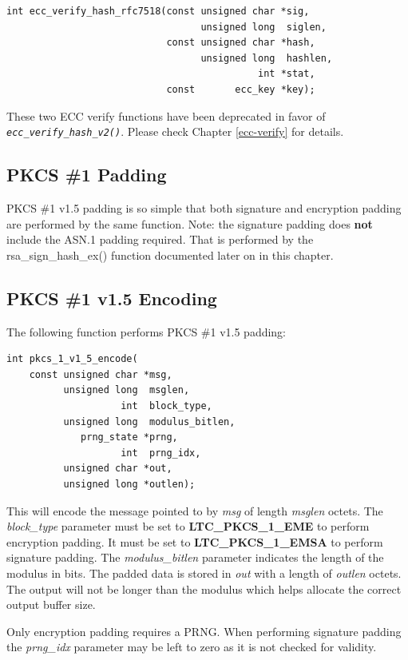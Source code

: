 \documentclass[synpaper]{book}
\newcommand{\code}[1]{\texttt{\textit{#1}}}
\begin{document}
\begin{verbatim}
int ecc_verify_hash_rfc7518(const unsigned char *sig,
                                  unsigned long  siglen,
                            const unsigned char *hash,
                                  unsigned long  hashlen,
                                            int *stat,
                            const       ecc_key *key);
\end{verbatim}

These two ECC verify functions have been deprecated in favor of \code{ecc\_verify\_hash\_v2()}.
Please check Chapter \ref{ecc-verify} for details.
\subsection{PKCS \#1 Padding}
PKCS \#1 v1.5 padding is so simple that both signature and encryption padding are performed by the same function.  Note: the
signature padding does \textbf{not} include the ASN.1 padding required.  That is performed by the rsa\_sign\_hash\_ex() function
documented later on in this chapter.

\subsection{PKCS \#1 v1.5 Encoding}
The following function performs PKCS \#1 v1.5 padding:
\begin{verbatim}
int pkcs_1_v1_5_encode(
    const unsigned char *msg,
          unsigned long  msglen,
                    int  block_type,
          unsigned long  modulus_bitlen,
             prng_state *prng,
                    int  prng_idx,
          unsigned char *out,
          unsigned long *outlen);
\end{verbatim}

This will encode the message pointed to by \textit{msg} of length \textit{msglen} octets.  The \textit{block\_type} parameter must be set to
\textbf{LTC\_PKCS\_1\_EME} to perform encryption padding.  It must be set to \textbf{LTC\_PKCS\_1\_EMSA} to perform signature padding.  The \textit{modulus\_bitlen}
parameter indicates the length of the modulus in bits.  The padded data is stored in \textit{out} with a length of \textit{outlen} octets.  The output will not be
longer than the modulus which helps allocate the correct output buffer size.

Only encryption padding requires a PRNG.  When performing signature padding the \textit{prng\_idx} parameter may be left to zero as it is not checked for validity.
\end{document}
